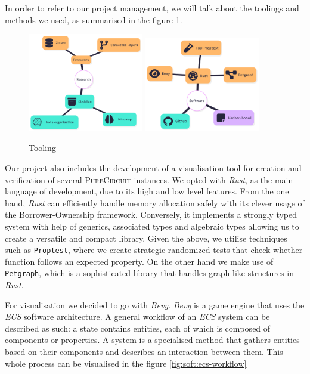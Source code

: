 In order to refer to our project management, we will talk about the toolings and methods we used,
as summarised in the figure \ref{fig:management:tooling}.

\begin{figure}
    \includegraphics[width=0.45\textwidth]{assets/research-visualisation.png}
    \includegraphics[width=0.45\textwidth]{assets/software-map.png}
    \caption{Tooling}\label{fig:management:tooling}
\end{figure}

Our project also includes the development of a visualisation tool for creation
and verification of several \textsc{PureCircuit} instances. We opted with \textit{Rust},
as the main language of development, due to its high and low level features.
From the one hand, \textit{Rust} can efficiently handle memory allocation safely
with its clever usage of the Borrower-Ownership framework. Conversely, it implements
a strongly typed system with help of generics, associated types and algebraic types
allowing us to create a versatile and compact library. Given the above, we utilise
techniques such as \texttt{Proptest}, where we create strategic randomized tests
that check whether  function follows an expected property. On the other hand
we make use of \texttt{Petgraph}, which is a sophisticated library that handles
graph-like structures in \textit{Rust}.


For visualisation we decided to go with \textit{Bevy}. \textit{Bevy} is a
game engine that uses the \textit{ECS} software architecture. A general
workflow of an \textit{ECS} system can be described as such: a state 
contains entities, each of which is composed of components or properties.
A system is a specialised method that gathers entities based on their components
and describes an interaction between them. This whole process can be visualised
in the figure \ref{fig:soft:ecs-workflow}


